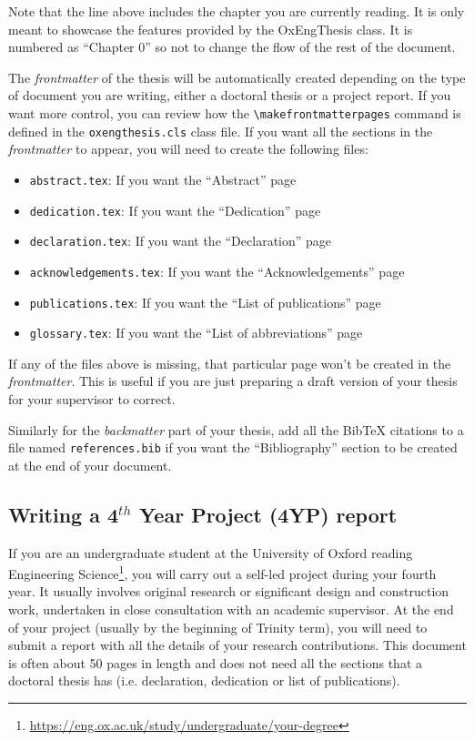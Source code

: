 Note that the line above includes the chapter you are currently reading. It is only meant to showcase the features provided by the OxEngThesis class. It is numbered as ``Chapter 0''
so not to change the flow of the rest of the document.

The \textit{frontmatter} of the thesis will be automatically created depending on the type of document you are writing, either a doctoral thesis or a project report. If you want more control, you can review how the \verb|\makefrontmatterpages| command is defined in the \verb|oxengthesis.cls| class file. If you want all the sections in the \textit{frontmatter} to appear, you will need to create the following files:

\begin{itemize}
    \item \verb|abstract.tex|: If you want the ``Abstract'' page
    \item \verb|dedication.tex|: If you want the ``Dedication'' page
    \item \verb|declaration.tex|: If you want the ``Declaration'' page
    \item \verb|acknowledgements.tex|: If you want the ``Acknowledgements'' page
    \item \verb|publications.tex|: If you want the ``List of publications'' page
    \item \verb|glossary.tex|: If you want the ``List of abbreviations'' page
\end{itemize}

If any of the files above is missing, that particular page won't be created in the \textit{frontmatter}. This is useful if you are just preparing a draft version of your thesis for your supervisor to correct. 

Similarly for the \textit{backmatter} part of your thesis, add all the BibTeX citations to a file named \verb|references.bib| if you want the ``Bibliography'' section to be created at the end of your document. 


\subsection{Writing a 4$^{th}$ Year Project (4YP) report}


If you are an undergraduate student at the University of Oxford reading Engineering Science\footnote{\url{https://eng.ox.ac.uk/study/undergraduate/your-degree}}, you will carry out a self-led project during your fourth year. It usually involves original research or significant design and construction work, undertaken in close consultation with an academic supervisor. At the end of your project (usually by the beginning of Trinity term), you will need to submit a report with all the details of your research contributions. This document is often about 50 pages in length and does not need all the sections that a doctoral thesis has (i.e. declaration, dedication or list of publications). 

